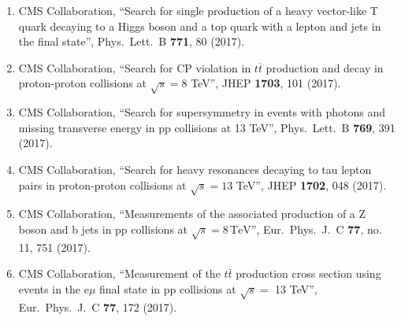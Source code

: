 \begin{enumerate}
\item CMS Collaboration, ``Search for single production of a heavy vector-like T quark decaying to a Higgs boson and a top quark with a lepton and jets in the final state'', Phys.\ Lett.\ B {\bf 771}, 80 (2017).

\item CMS Collaboration, ``Search for CP violation in $ t\overline{t} $ production and decay in proton-proton collisions at $ \sqrt{s}=8 $ TeV'', JHEP {\bf 1703}, 101 (2017).

\item CMS Collaboration, ``Search for supersymmetry in events with photons and missing transverse energy in pp collisions at 13 TeV'', Phys.\ Lett.\ B {\bf 769}, 391 (2017).

\item CMS Collaboration, ``Search for heavy resonances decaying to tau lepton pairs in proton-proton collisions at $ \sqrt{s}=13 $ TeV'', JHEP {\bf 1702}, 048 (2017).

\item CMS Collaboration, ``Measurements of the associated production of a Z boson and b jets in pp collisions at ${\sqrt{s}} = 8\,\text {TeV} $'', Eur.\ Phys.\ J.\ C {\bf 77}, no. 11, 751 (2017).

\item CMS Collaboration, ``Measurement of the $t\bar{t}$ production cross section using events in the e$\mu$ final state in pp collisions at $\sqrt{s} =$ 13 TeV'', Eur.\ Phys.\ J.\ C {\bf 77}, 172 (2017).


\end{enumerate}
